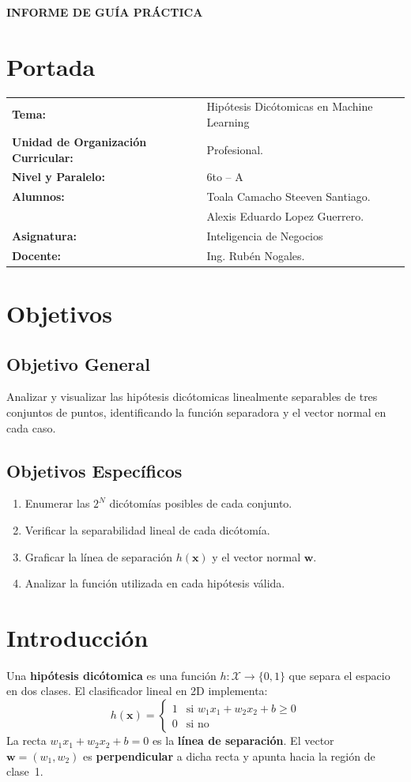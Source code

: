 \documentclass[12pt,a4paper]{article}
\begin{document}
\begin{center}{\large\textbf{INFORME DE GU\'IA PR\'ACTICA}}\end{center}
\section{Portada}
\begin{flushleft}\renewcommand{\arraystretch}{1.3}
\begin{tabular}{@{} l p{10cm} @{}}
  \textbf{Tema:} & Hip\'otesis Dic\'otomicas en Machine Learning \\
  \textbf{Unidad de Organizaci\'on Curricular:} & Profesional. \\
  \textbf{Nivel y Paralelo:} & 6to -- A \\
  \textbf{Alumnos:} & Toala Camacho Steeven Santiago. \\ & Alexis Eduardo Lopez Guerrero. \\
  \textbf{Asignatura:} & Inteligencia de Negocios \\
  \textbf{Docente:} & Ing. Rub\'en Nogales. \\
\end{tabular}\end{flushleft}
\section{Objetivos}
\subsection*{Objetivo General}
Analizar y visualizar las hip\'otesis dic\'otomicas linealmente separables
de tres conjuntos de puntos, identificando la funci\'on separadora y el vector
normal en cada caso.
\subsection*{Objetivos Espec\'ificos}
\begin{enumerate}[label=\arabic*.]
  \item Enumerar las $2^N$ dic\'otom\'ias posibles de cada conjunto.
  \item Verificar la separabilidad lineal de cada dic\'otom\'ia.
  \item Graficar la l\'inea de separaci\'on $h(\mathbf{x})$ y el vector normal $\mathbf{w}$.
  \item Analizar la funci\'on utilizada en cada hip\'otesis v\'alida.
\end{enumerate}
\section{Introducci\'on}
Una \textbf{hip\'otesis dic\'otomica} es una funci\'on $h:\mathcal{X}\to\{0,1\}$
que separa el espacio en dos clases. El clasificador lineal en 2D implementa:
\[ h(\mathbf{x}) = \begin{cases} 1 & \text{si } w_1 x_1 + w_2 x_2 + b \geq 0 \\ 0 & \text{si no} \end{cases} \]
La recta $w_1 x_1 + w_2 x_2 + b = 0$ es la \textbf{l\'inea de separaci\'on}.
El vector $\mathbf{w}=(w_1,w_2)$ es \textbf{perpendicular} a dicha recta y
apunta hacia la regi\'on de clase~1.
\end{document}
